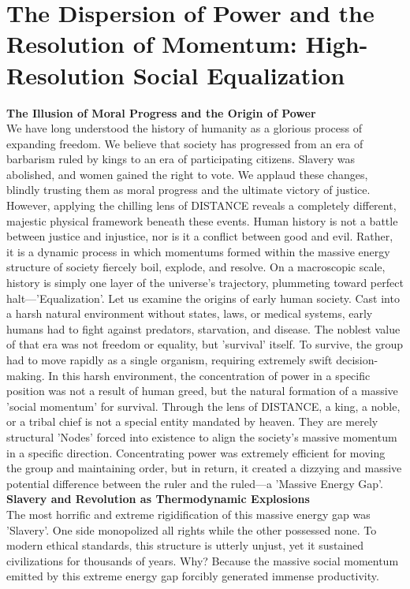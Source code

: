 

\section{The Dispersion of Power and the Resolution of Momentum: High-Resolution Social Equalization}
\textbf{The Illusion of Moral Progress and the Origin of Power} \\
We have long understood the history of humanity as a glorious process of expanding freedom. We believe that society has progressed from an era of barbarism ruled by kings to an era of participating citizens. Slavery was abolished, and women gained the right to vote. We applaud these changes, blindly trusting them as moral progress and the ultimate victory of justice.
However, applying the chilling lens of DISTANCE reveals a completely different, majestic physical framework beneath these events. Human history is not a battle between justice and injustice, nor is it a conflict between good and evil. Rather, it is a dynamic process in which momentums formed within the massive energy structure of society fiercely boil, explode, and resolve. On a macroscopic scale, history is simply one layer of the universe's trajectory, plummeting toward perfect halt—'Equalization'.
Let us examine the origins of early human society. Cast into a harsh natural environment without states, laws, or medical systems, early humans had to fight against predators, starvation, and disease. The noblest value of that era was not freedom or equality, but 'survival' itself. To survive, the group had to move rapidly as a single organism, requiring extremely swift decision-making.
In this harsh environment, the concentration of power in a specific position was not a result of human greed, but the natural formation of a massive 'social momentum' for survival. Through the lens of DISTANCE, a king, a noble, or a tribal chief is not a special entity mandated by heaven. They are merely structural 'Nodes' forced into existence to align the society's massive momentum in a specific direction. Concentrating power was extremely efficient for moving the group and maintaining order, but in return, it created a dizzying and massive potential difference between the ruler and the ruled—a 'Massive Energy Gap'. \\
\textbf{Slavery and Revolution as Thermodynamic Explosions} \\ 
The most horrific and extreme rigidification of this massive energy gap was 'Slavery'. One side monopolized all rights while the other possessed none. To modern ethical standards, this structure is utterly unjust, yet it sustained civilizations for thousands of years. Why? Because the massive social momentum emitted by this extreme energy gap forcibly generated immense productivity.
